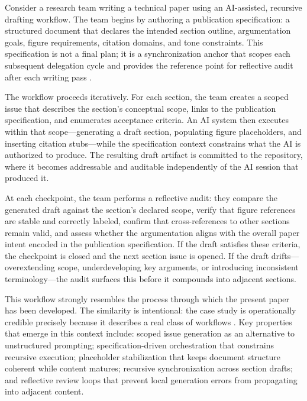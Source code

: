 Consider a research team writing a technical paper using an AI-assisted, recursive drafting workflow. The team begins by authoring a publication specification: a structured document that declares the intended section outline, argumentation goals, figure requirements, citation domains, and tone constraints. This specification is not a final plan; it is a synchronization anchor that scopes each subsequent delegation cycle and provides the reference point for reflective audit after each writing pass \cite{Parnas1972Modularization}.

The workflow proceeds iteratively. For each section, the team creates a scoped issue that describes the section's conceptual scope, links to the publication specification, and enumerates acceptance criteria. An AI system then executes within that scope---generating a draft section, populating figure placeholders, and inserting citation stubs---while the specification context constrains what the AI is authorized to produce. The resulting draft artifact is committed to the repository, where it becomes addressable and auditable independently of the AI session that produced it.

At each checkpoint, the team performs a reflective audit: they compare the generated draft against the section's declared scope, verify that figure references are stable and correctly labeled, confirm that cross-references to other sections remain valid, and assess whether the argumentation aligns with the overall paper intent encoded in the publication specification. If the draft satisfies these criteria, the checkpoint is closed and the next section issue is opened. If the draft drifts---overextending scope, underdeveloping key arguments, or introducing inconsistent terminology---the audit surfaces this before it compounds into adjacent sections.

This workflow strongly resembles the process through which the present  paper has been developed. The similarity is intentional: the case study is operationally credible precisely because it describes a real class of workflows \cite{Hutchins1995CognitionWild}. Key  properties that emerge in this context include: scoped issue generation as an alternative to unstructured prompting; specification-driven orchestration that constrains recursive execution; placeholder stabilization that keeps document structure coherent while content matures; recursive synchronization across section drafts; and reflective review loops that prevent local generation errors from propagating into adjacent content.

